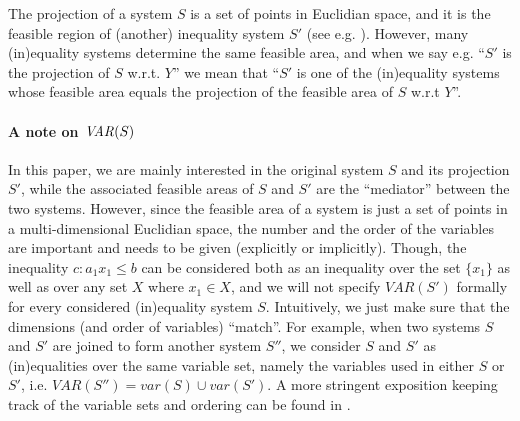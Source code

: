 The projection of a system $S$ is a set of points in Euclidian space, and it is the feasible region of (another) inequality system $S'$ (see e.g. \cite{ziegler95}). However, many (in)equality systems determine the same feasible area, and when we say e.g. ``$S'$ is the projection of $S$ w.r.t. $Y$'' we mean that ``$S'$ is one of the (in)equality systems whose feasible area equals the projection of the feasible area of $S$ w.r.t $Y$''.

\paragraph{A note on $\mathit{VAR}(S)$}
In this paper, we are mainly interested in the original system $S$ and its projection $S'$, while the associated feasible areas of $S$ and $S'$ are the ``mediator'' between the two systems. 
However, since the feasible area of a system is just a set of points in a multi-dimensional Euclidian space, the number and the order of the variables are important and needs to be given (explicitly or implicitly). 
%
Though, the inequality $c:a_1x_1\leq b$ can be considered both as an inequality over the set $\{x_1\}$ as well as over any set $X$ where $x_1\in X$, and we will not specify $VAR(S')$ formally for every considered (in)equality system $S$.
Intuitively, we just make sure that the dimensions (and order of variables) ``match''. For example, when two systems $S$ and $S'$ are joined to form another system $S''$, we consider $S$ and $S'$ as (in)equalities over the same variable set, namely the variables used in either $S$ or $S'$, i.e. $VAR(S'')=var(S)\cup var(S')$.
A more stringent exposition keeping track of the variable sets and ordering can be found in \cite{MyTechRep}.
%

\iffalse
\paragraph{[Is probably not needed]}
[We say that two (in)equality systems $S_1$ and $S_2$ are \emph{equivalent} and write $S_1\cong S_2$ if 
$\VAR(S_1)=\VAR(S_2)$ and $\feas(S_1) = \feas(S_2)$.]

[If $Y_1,\ldots, Y_k$ is a partition of $Y$ then we have that $\proj_Y(P)=\proj_{Y_1}(\proj_{Y_2}(\ldots (\proj_{Y_k}(P))\ldots))$.]

[It follows that if $S_1, S_2\subseteq S$, then $\feas(S_1\cup S_2) = \feas(S_1)\cap \feas(S_2)$.]

[In linear programming, it is common to have bounds for some of the variables in an (in)equality system $S$. For our purpose, upper and lower bounds are modeled as inequalities. ]
\fi